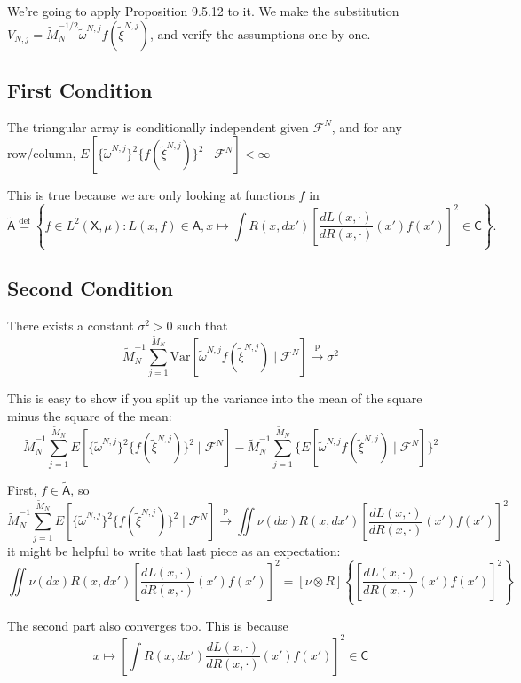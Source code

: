 \documentclass{article}
\begin{document}
We're going to apply Proposition 9.5.12 to it. We make the substitution $V_{N,j} = \tilde{M}_N^{-1/2} \tilde{\omega}^{N,j} f(\tilde{\xi}^{N,j})$, and verify the assumptions one by one. 
\newline

\subsection{First Condition}


The triangular array is conditionally independent given $\mathcal{F}^N$, and for any row/column, $E[ \{\tilde{\omega}^{N,j}\}^2 \{f(\tilde{\xi}^{N,j})\}^2 \mid \mathcal{F}^N] < \infty$

This is true because we are only looking at functions $f$ in 
$$
\tilde{\mathsf{A}} \overset{\text{def}}{=} \left\{ f \in L^2(\mathsf{X}, \mu) : L(x,f) \in \mathsf{A}, x \mapsto \int R(x,dx')\left[ \frac{dL(x,\cdot)}{dR(x,\cdot)}(x') f(x') \right]^2 \in \mathsf{C} \right\}.
$$



\subsection{Second Condition}

There exists a constant $\sigma^2 >0$ such that
$$
\tilde{M}_N^{-1}\sum_{j=1}^{\tilde{M}_N} \text{Var}\left[  \tilde{\omega}^{N,j} f(\tilde{\xi}^{N,j})  \mid \mathcal{F}^N \right] \overset{\text{p}}{\to} \sigma^2
$$

This is easy to show if you split up the variance into the mean of the square minus the square of the mean:
$$
\tilde{M}_N^{-1}\sum_{j=1}^{\tilde{M}_N} E\left[  \{\tilde{\omega}^{N,j}\}^2 \{f(\tilde{\xi}^{N,j})\}^2  \mid \mathcal{F}^N \right] - \tilde{M}_N^{-1}\sum_{j=1}^{\tilde{M}_N} \{E\left[  \tilde{\omega}^{N,j} f(\tilde{\xi}^{N,j})  \mid \mathcal{F}^N \right]\}^2
$$

First, $f \in \tilde{\mathsf{A}}$, so 
$$
\tilde{M}_N^{-1}\sum_{j=1}^{\tilde{M}_N} E\left[  \{\tilde{\omega}^{N,j}\}^2 \{f(\tilde{\xi}^{N,j})\}^2  \mid \mathcal{F}^N \right] \overset{\text{p}}{\to}
\iint \nu(dx) R(x,dx')\left[ \frac{dL(x,\cdot)}{dR(x,\cdot)}(x') f(x') \right]^2
$$
it might be helpful to write that last piece as an expectation:
$$
\iint \nu(dx) R(x,dx')\left[ \frac{dL(x,\cdot)}{dR(x,\cdot)}(x') f(x') \right]^2
=
[\nu \otimes R]\left\{ \left[ \frac{dL(x,\cdot)}{dR(x,\cdot)}(x') f(x') \right]^2 \right\}
$$

The second part also converges too. This is because 
$$
x \mapsto \left[ \int R(x,dx') \frac{dL(x,\cdot)}{dR(x,\cdot)}(x') f(x') \right]^2 \in \mathsf{C}
$$
\end{document}
